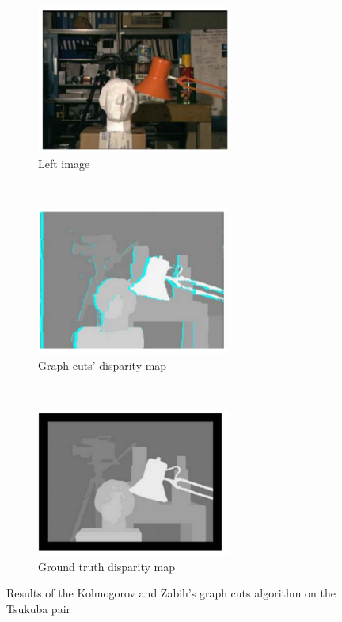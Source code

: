 \begin{figure}[h!]
\centering
\begin{subfigure}[]{0.4\textwidth}
\centering
\includegraphics[width=0.7\textwidth]{./img/gf1.png}
\caption{\scriptsize{Left image}}
\end{subfigure}%
~ %
\begin{subfigure}[]{0.4\textwidth}
\centering
\includegraphics[width=0.7\textwidth]{./img/gf2.png}
\caption{\scriptsize{Graph cuts' disparity map}}
\end{subfigure} 
~\quad
\begin{subfigure}[]{0.4\textwidth}
\centering
\includegraphics[width=0.7\textwidth]{./img/gf3.png}
\caption{\scriptsize{Ground truth disparity map}}
\label{disparity}
\end{subfigure}%
\caption{\small{Results of the Kolmogorov and Zabih's graph cuts algorithm on the Tsukuba pair}}
\end{figure}
\newline
